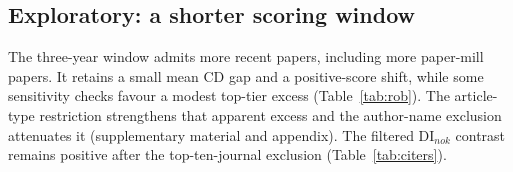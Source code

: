 \subsection{Exploratory: a shorter scoring window}
The three-year window admits more recent papers, including more paper-mill papers.
It retains a small mean CD gap and a positive-score shift, while some sensitivity checks favour a modest top-tier
excess (Table~\ref{tab:rob}). The article-type restriction strengthens that apparent excess and the author-name
exclusion attenuates it (supplementary material and appendix). The filtered DI$_{nok}$ contrast remains positive after the top-ten-journal
exclusion (Table~\ref{tab:citers}).
